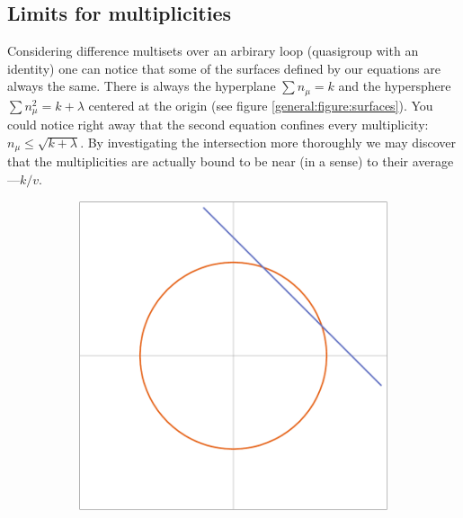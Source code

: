\subsection{Limits for multiplicities}
    Considering difference multisets over an arbirary loop (quasigroup with an identity) one can notice that some of the surfaces defined by our equations are always the same. There is always the hyperplane $\sum {n_\mu} = k$ and the hypersphere $\sum n_\mu^2 = k + \lambda$ centered at the origin (see figure \ref{general:figure:surfaces}). You could notice right away that the second equation confines every multiplicity: $n_\mu \leq \sqrt{k+\lambda}$. By investigating the intersection more thoroughly we may discover that the multiplicities are actually bound to be near (in a sense) to their average---$k/v$.

    \begin{figure}
        \centering
        \begin{subfigure}[b]{0.5\textwidth}
            \includegraphics[width=\textwidth]{assets/surfacesIn2D}
        \end{subfigure}%
        ~
        \begin{subfigure}[b]{0.5\textwidth}

\end{subfigure}
\end{figure}
